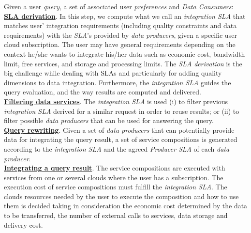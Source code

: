 Given a user \textit{query}, a set of associated user \textit{preferences} and \textsl{Data Consumers}:
\\
\textbf{\underline{SLA derivation}}. In this step, we compute what we call an \textsl{integration SLA} that matches user' integration requirements (including quality constraints and data requirements) with the \textsl{SLA}'s provided by \textsl{data producers}, given a specific user cloud subscription. The user may have general requirements depending on the context he/she wants to integrate his/her data such as economic cost, bandwidth limit, free services, and storage and processing limits. The \textit{SLA derivation} is the big challenge while dealing with SLAs and particularly for adding quality dimensions to data integration. Furthermore, the \textsl{integration SLA} guides the query evaluation, and the way results are computed and delivered. \\
\textbf{\underline{Filtering data services}}. The \textsl{integration SLA} is used (i)
to filter previous \textsl{integration SLA} derived for a similar request in order to reuse results; or (ii) to filter possible \textsl{data producers} that can be used for answering the query. \\ %
\textbf{\underline{Query rewriting}}. Given a set of \textit{data producers} that can
potentially provide data for integrating the query result, a set of service compositions is generated according to the \textsl{integration SLA} and the agreed \textsl{Producer SLA} of each \textsl{data producer}. \\
\textbf{\underline{Integrating a query result}}. The service compositions are
executed with services from one or several clouds where the user has a
subscription.
The execution cost of service compositions must fulfill the \textsl{integration
SLA}. The clouds resources needed by the user to execute the composition and how
to use them is decided taking in consideration the economic cost determined by
the data to be transferred, the number of external calls to services, data storage and delivery cost.

 
